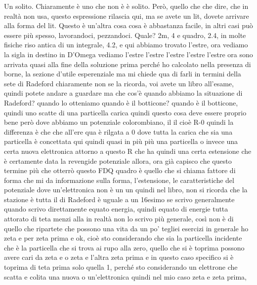 \begin{soluzione}
   Un solito. Chiaramente è uno che non è è solito. Però, quello che che dire, che in realtà non usa, questo espressione rilascia qui, ma se avete un lit, dovete arrivare alla forma del lit. Questo è un'altra cosa cosa è abbastanza facile, in altri casi può essere più spesso, lavorandoci, pezzandoci. Quale? 2m, 4 e quadro, 2.4, in molte fisiche riso antica di un integrale, 4.2, e qui abbiamo trovato l'estre, ora vediamo la sigla in destino in D'Omega vediamo l'estre l'estre l'estre l'estre l'estre ora sono arrivata quasi alla fine della soluzione prima perché ho calcolato nella presenza di borne, la sezione d'utile esperenziale ma mi chiede qua di farli in termini della sete di Radeford chiaramente non se la ricorda, voi avete un libro all'esame, quindi potete andare a guardare ma che cos'è quando abbiamo la situazione di Radeford? quando lo otteniamo quando è il botticone? quando è il botticone, quindi uno scatte di una particella carica quindi questo cosa deve essere proprio bene però dove abbiamo un potenziale colorombiano, il il cioè R-0 quindi la differenza è che che all'ere qua è rilgata a 0 dove tutta la carica che sia una particella è concettata qui quindi quasi in più più una particella o invece una certa nuova elettronica attorno a questo R che ha quindi una certa estensione che è certamente data la revengide potenziale allora, ora già capisco che questo termine più che otterrò questo FDQ quadro è quello che si chiama fattore di forma che mi da informazione sulla forma, l'estensione, le caratteristiche del potenziale dove un'elettronica non è un un quindi nel libro, non si ricorda che la stazione è tutta il di Radeford è uguale a un 16esimo se scrivo generalmente quando scrivo direttamente equato energia, quindi equato di energie tutta attorato di teta menzi alla in realtà non lo scrivo più generale, così non è di quello che ripartete che possono una vita da un po' tegliei esercizi in generale ho zeta e per zeta prima e ok, cioè sto considerando che sia la particella incidente che è la particella che si trova ai rupo alla zero, quello che si è toprima possono avere cari da zeta e o zeta e l'altra zeta prima e in questo caso specifico si è toprima di teta prima solo quella 1, perché sto considerando un elettrone che scatta e colita una nuova o un'elettronica quindi nel mio caso zeta e zeta prima, 
   

\end{soluzione}
